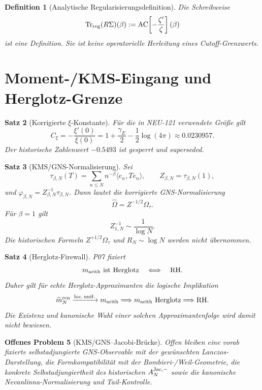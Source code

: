 \documentclass[11pt,a4paper]{amsart}
\newtheorem{theorem}{Satz}[section]
\newtheorem{definition}[theorem]{Definition}
\newtheorem{openproblem}[theorem]{Offenes Problem}
\newcommand{\RH}{\mathrm{RH}}
\newcommand{\Tr}{\operatorname{Tr}}
\newcommand{\AC}{\operatorname{AC}}
\begin{document}
\begin{definition}[Analytische Regularisierungsdefinition]
\label{def:trreg}
Die Schreibweise
\[
  \Tr_{\rm reg}(R\Sigma)(\beta)
  :=\AC\!\left[-\frac{\zeta'}{\zeta}\right](\beta)
\]
ist eine Definition. Sie ist keine operatorielle Herleitung eines
Cutoff-Grenzwerts.
\end{definition}

\section{Moment-/KMS-Eingang und Herglotz-Grenze}

\begin{theorem}[Korrigierte $\xi$-Konstante]\label{thm:cxi}
Für die in NEU-121 verwendete Größe gilt
\[
  C_\xi=-\frac{\xi'(0)}{\xi(0)}
  =1+\frac{\gamma_E}{2}-\frac12\log(4\pi)
  \approx0.0230957.
\]
Der historische Zahlenwert $-0.5493$ ist gesperrt und superseded.
\end{theorem}

\begin{theorem}[KMS/GNS-Normalisierung]\label{thm:gns-normalization}
Sei
\[
  \tau_{\beta,N}(T)=\sum_{n\le N}n^{-\beta}\langle e_n,Te_n\rangle,
  \qquad Z_{\beta,N}=\tau_{\beta,N}(1),
\]
und $\varphi_{\beta,N}=Z_{\beta,N}^{-1}\tau_{\beta,N}$. Dann lautet die
korrigierte GNS-Normalisierung
\[
  \widehat\Omega=Z^{-1/2}\Omega_\tau.
\]
Für $\beta=1$ gilt
\[
  Z_{1,N}^{-1}\sim\frac1{\log N}.
\]
Die historischen Formeln $Z^{+1/2}\Omega_\tau$ und $R_N\sim\log N$ werden
nicht übernommen.
\end{theorem}

\begin{theorem}[Herglotz-Firewall]\label{thm:herglotz-firewall}
P07 fixiert
\[
  m_{\rm arith}\text{ ist Herglotz}\quad\Longleftrightarrow\quad\RH.
\]
Daher gilt für echte Herglotz-Approximanten die logische Implikation
\[
  \widetilde m_N^{\rm ren}
  \xrightarrow{\rm loc.\,unif.}m_{\rm arith}
  \Longrightarrow
  m_{\rm arith}\text{ Herglotz}
  \Longrightarrow\RH.
\]
Die Existenz und kanonische Wahl einer solchen Approximantenfolge wird damit
nicht bewiesen.
\end{theorem}

\begin{openproblem}[KMS/GNS--Jacobi-Brücke]\label{op:kms-jacobi}
Offen bleiben eine vorab fixierte selbstadjungierte GNS-Observable mit der
gewünschten Lanczos-Darstellung, die Formkompatibilität mit der
Bombieri-/Weil-Geometrie, die konkrete Selbstadjungiertheit des historischen
$A_N^{\rm Jac,-}$ sowie die kanonische Nevanlinna-Normalisierung und
Tail-Kontrolle.
\end{openproblem}
\end{document}
